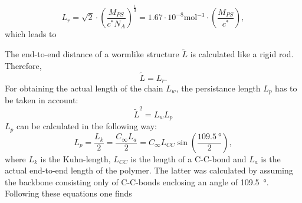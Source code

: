 \begin{equation}
    L_r = \sqrt{2} \cdot (\frac{M_{PS}}{c^*N_A})^\frac{1}{3} = 1.67 \cdot 10^{-8} \si{\mol^{-3}} \cdot (\frac{M_{PS}}{c^*}),
\end{equation}
which leads to \par 
\centerline{} \par
The end-to-end distance of a wormlike structure $\widetilde{L}$ is calculated like a rigid rod. Therefore, 
\begin{equation}
    \widetilde{L} = L_r.
\end{equation} 
For obtaining the actual length of the chain $L_w$, the persistance length $L_p$ has to be taken in account: 
\begin{equation}
    \widetilde{L}^2 = L_w L_p
\end{equation}
$L_p$ can be calculated in the following way:
\begin{equation}
    L_p = \frac{L_k}{2} = \frac{C_{\infty}L_a}{2} = C_{\infty}L_{CC}\sin(\frac{\SI{109.5}{\degree}}{2}),
\end{equation}
where $L_k$ is the Kuhn-length, $L_{CC}$ is the length of a C-C-bond and $L_a$ is the actual end-to-end length of the polymer. The latter was calculated by assuming the backbone consisting only of C-C-bonds enclosing an angle of \SI{109.5}{\degree}. Following these equations one finds \par 
\centerline{} \par